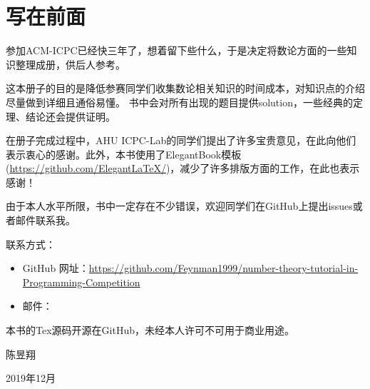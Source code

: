\chapter*{写在前面}
	参加ACM-ICPC已经快三年了，想着留下些什么，于是决定将数论方面的一些知识整理成册，供后人参考。
	
	这本册子的目的是{\heiti 降低参赛同学们收集数论相关知识的时间成本}，对知识点的介绍尽量做到详细且通俗易懂。
	书中会对所有出现的题目提供solution，一些经典的定理、结论还会提供证明。
	
	在册子完成过程中，AHU ICPC-Lab的同学们提出了许多宝贵意见，在此向他们表示衷心的感谢。此外，本书使用了ElegantBook模板
	(\href{https://github.com/ElegantLaTeX/}{https://github.com/ElegantLaTeX/})，减少了许多排版方面的工作，在此也表示感谢！
		
	由于本人水平所限，书中一定存在不少错误，欢迎同学们在GitHub上提出issues或者邮件联系我。\\
	
	\vbox{}
	

联系方式：
	\begin{itemize}
		\item GitHub 网址：\href{https://github.com/Feynman1999/number-theory-tutorial-in-Programming-Competition}{https://github.com/Feynman1999/number-theory-tutorial-in-Programming-Competition}
		\item 邮件：
	\end{itemize}

\vbox{}

本书的Tex源码开源在GitHub，未经本人许可不可用于商业用途。\\

\vbox{}

\begin{flushright}
陈昱翔

2019年12月
\end{flushright}
	